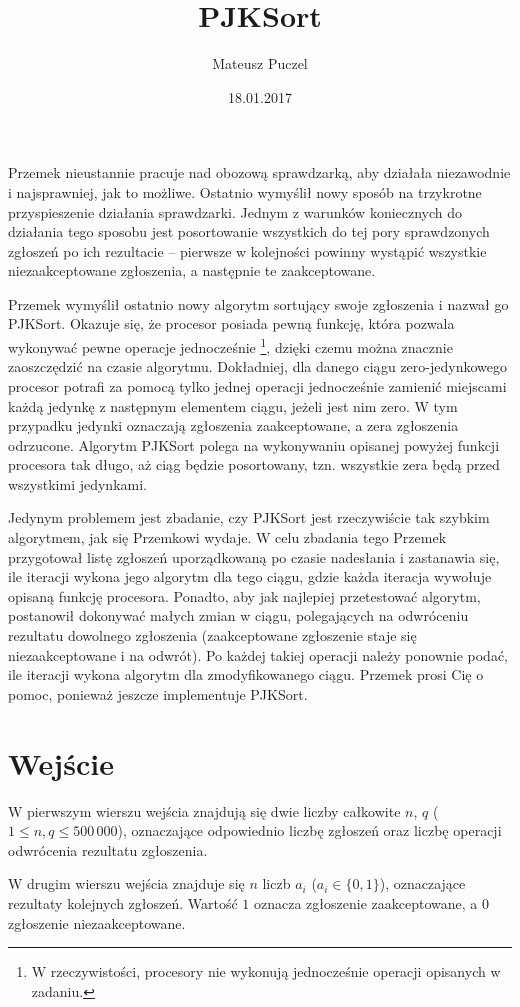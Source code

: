 \documentclass[zad,zawodnik,utf8]{sinol}
\title{PJKSort}
\author{Mateusz Puczel} %
\date{18.01.2017}
\begin{document}
\begin{tasktext}%
Przemek nieustannie pracuje nad obozową sprawdzarką, aby działała niezawodnie i najsprawniej, jak to możliwe. Ostatnio wymyślił nowy sposób na trzykrotne
przyspieszenie działania sprawdzarki. Jednym z warunków koniecznych do działania tego sposobu jest posortowanie wszystkich do tej pory sprawdzonych zgłoszeń
po ich rezultacie -- pierwsze w kolejności powinny wystąpić wszystkie niezaakceptowane zgłoszenia, a następnie te zaakceptowane.

Przemek wymyślił ostatnio nowy algorytm sortujący swoje zgłoszenia i nazwał go PJKSort. Okazuje się, że procesor posiada pewną funkcję, która pozwala wykonywać pewne operacje jednocześnie \footnote{W rzeczywistości, procesory nie wykonują jednocześnie operacji opisanych w zadaniu.}, dzięki
czemu można znacznie zaoszczędzić na czasie algorytmu. Dokładniej, dla danego ciągu zero-jedynkowego procesor potrafi za pomocą tylko jednej operacji jednocześnie zamienić
miejscami każdą jedynkę z następnym elementem ciągu, jeżeli jest nim zero. W tym przypadku jedynki oznaczają zgłoszenia zaakceptowane, a zera zgłoszenia odrzucone.
Algorytm PJKSort polega na wykonywaniu opisanej powyżej funkcji procesora tak długo, aż ciąg będzie posortowany, tzn. wszystkie zera będą przed wszystkimi jedynkami.

Jedynym problemem jest zbadanie, czy PJKSort jest rzeczywiście tak szybkim algorytmem, jak się Przemkowi wydaje. W celu zbadania tego Przemek
przygotował listę zgłoszeń uporządkowaną po czasie nadesłania i zastanawia się, ile iteracji wykona jego algorytm dla tego ciągu, gdzie każda iteracja
wywołuje opisaną funkcję procesora. Ponadto, aby
jak najlepiej przetestować algorytm, postanowił dokonywać małych zmian w ciągu, polegających na odwróceniu rezultatu dowolnego zgłoszenia (zaakceptowane zgłoszenie staje się niezaakceptowane i na odwrót).
Po każdej takiej operacji należy ponownie podać, ile iteracji wykona algorytm dla zmodyfikowanego ciągu. Przemek prosi Cię o pomoc, ponieważ jeszcze implementuje
PJKSort.

  \section{Wejście}
W pierwszym wierszu wejścia znajdują się dwie liczby całkowite $n$, $q$ ($1 \leq n, q \leq 500\,000$), oznaczające odpowiednio liczbę zgłoszeń oraz liczbę operacji
odwrócenia rezultatu zgłoszenia.

W drugim wierszu wejścia znajduje się $n$ liczb $a_i$ ($a_i \in \{0, 1\}$), oznaczające rezultaty kolejnych zgłoszeń. Wartość $1$ oznacza zgłoszenie zaakceptowane,
a $0$ zgłoszenie niezaakceptowane.


\end{tasktext}
\end{document}
